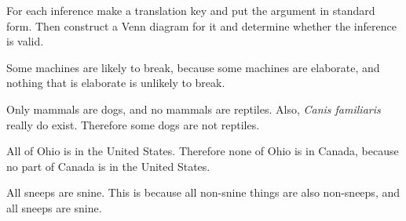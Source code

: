 {\begin{exercises}
\end{exercises}
\noindent \problempart For each inference make a translation key and put the argument in standard form. Then construct a Venn diagram for it and determine whether the inference is valid. 


\begin{exercises} 

\item Some machines are likely to break, because some machines are elaborate, and nothing that is elaborate is unlikely to break. 

 
\item Only mammals are dogs, and no mammals are reptiles. Also, \emph{Canis familiaris} really do exist. Therefore some dogs are not reptiles.




\item All of Ohio is in the United States. Therefore none of Ohio is in Canada, because no part of Canada is in the United States. 



\item All sneeps are snine. This is because all non-snine things are also non-sneeps, and all sneeps are snine. 

\end{exercises}}
